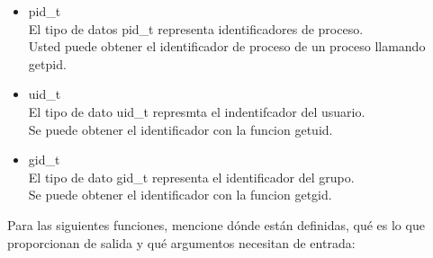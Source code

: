 	\begin{itemize}

		\item pid\_t\\ El tipo de datos pid\_t representa identificadores de proceso.\\ Usted puede obtener el identificador de proceso de un proceso llamando getpid. 
		
		\item uid\_t\\ El tipo de dato uid\_t represmta el indentifcador del usuario.\\ Se puede obtener el identificador con la funcion getuid.
				
		\item gid\_t \\ El tipo de dato gid\_t representa el identificador del grupo.
		\\ Se puede obtener el identificador con la funcion getgid.

	\end{itemize}

	Para las siguientes funciones, mencione dónde están definidas, qué es lo que proporcionan de salida y qué argumentos necesitan de entrada:

